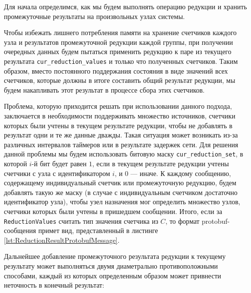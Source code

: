 Для начала определимся, как мы будем выполнять операцию редукции и хранить промежуточные результаты на произвольных узлах системы.

Чтобы избежать лишнего потребления памяти на хранение счетчиков каждого узла и результатов промежуточной редукции каждой группы, при получении очередных данных будем пытаться применить редукцию к паре из текущего результата \texttt{cur\_re\-duc\-ti\-on\_values} и только что полученных счетчиков. Таким образом, вместо постоянного поддержания состояния в виде значений всех счетчиков, которые должны в итоге составить общий результат редукции, мы будем накапливать этот результат в процессе сбора этих счетчиков.

Проблема, которую приходится решать при использовании данного подхода, заключается в необходимости поддерживать множество источников, счетчики которых были учтены в текущем результате редукции, чтобы не добавлять в результат одни и те же данные дважды. Такая ситуация может возникать из-за различных интервалов таймеров или в результате задержек сети. Для решения данной проблемы мы будем использовать битовую маску \texttt{cur\_re\-duc\-ti\-on\_set}, в которой $i$-й бит будет равен $1$, если в текущем результате редукции учтены счетчики с узла с идентификатором $i$, и $0$ --- иначе. К каждому сообщению, содержащему индивидуальный счетчик или промежуточную редукцию, будем добавлять такую же маску (в случае с индивидуальным счетчиком достаточно идентификатор узла), чтобы узел назначения мог определить множество узлов, счетчики которых были учтены в пришедшем сообщении. Итого, если за \texttt{ReductionValues} считать тип значения счетчика из $C$, то формат protobuf-сообщения примет вид, представленный в листинге \ref{lst:ReductionResultProtobufMessage}.


Дальнейшее добавление промежуточного результата редукции к текущему результату может выполняться двумя диаметрально противоположными способами, каждый из которых определенным образом может привнести неточность в конечный результат:

